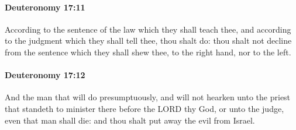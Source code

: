 		\paragraph{Deuteronomy 17:11} %
			\label{DEUTERONOMY-17-11}

			According to the sentence of the law which they shall teach thee, and according to the judgment which they shall tell thee, thou shalt do: thou shalt not decline from the sentence which they shall shew thee, to the right hand, nor to the left.


		\paragraph{Deuteronomy 17:12} %
			\label{DEUTERONOMY-17-12}

			And the man that will do presumptuously, and will not hearken unto the priest that standeth to minister there before the LORD thy God, or unto the judge, even that man shall die: and thou shalt put away the evil from Israel.

